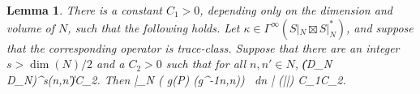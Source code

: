 \documentclass[11pt]{article}
\theoremstyle{plain}
\newtheorem{lemma}[theorem]{Lemma}
\theoremstyle{definition}
\theoremstyle{remark}
\numberwithin{equation}{section}
\DeclareMathOperator{\Tr}{Tr}
\DeclareMathOperator{\tr}{tr}
\begin{document}
%
%
\begin{lemma}\label{lem ker proj}
There is a constant $C_1>0$, depending only on the dimension and volume of $N$,  such that the following holds.
Let $\kappa \in \Gamma^{\infty}(S|_N \boxtimes S|_N^*)$, and suppose that the corresponding operator is trace-class. Suppose that there  are an integer $s > \dim(N)/2$ and a $C_2>0$ such that for all $n,n' \in N$,
\| (D_N \otimes D_N)^s\kappa(n,n')\| \leq C_2.
\eeq
Then
\left|\int_N \tr ( g(\kappa \circ P) (g^{-1}n,n)) \, dn \right| \leq \Tr(|\kappa|) \leq C_1C_2.
\eeq
\end{lemma}
\end{document}
